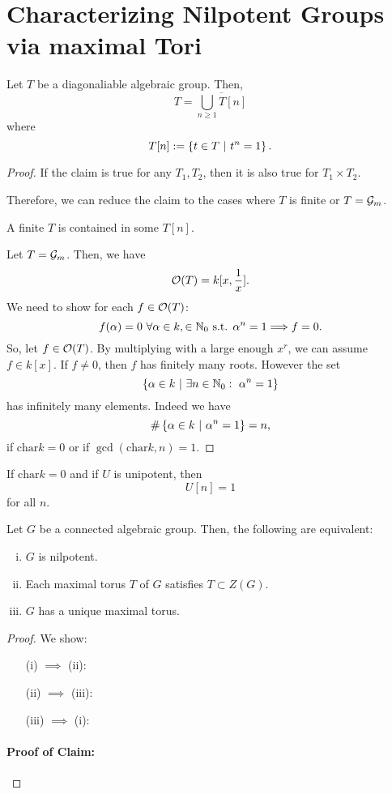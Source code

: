 \section{Characterizing Nilpotent Groups via maximal Tori}

\begin{lemma}
	Let $T$ be a diagonaliable algebraic group. Then,
	\[ T = \overline{\bigcup_{n \geq 1} T[n]} \]
	where
	\[ T[n] := \left\lbrace t \in T ~ | ~ t^n = 1\right\rbrace. \]
\end{lemma}
\begin{proof}
	If the claim is true for any $T_1, T_2$, then it is also true for $T_1\times T_2$.
	
	Therefore, we can reduce the claim to the cases where $T$ is finite or $T = \mathcal{G}_m$.
	
	A finite $T$ is contained in some $T[n]$.
	
	Let $T = \mathcal{G}_m$. Then, we have
	\[ \mathcal{O}(T) = k[x, \frac{1}{x}]. \]
	We need to show for each $f \in \mathcal{O}(T)$:
	\[ f(\alpha)  = 0 ~\forall \alpha \in k, \in \mathbb{N}_0 \text{ s.t. } \alpha^n = 1 \overset{}{\Longrightarrow} f = 0. \]
	So, let $f \in \mathcal{O}(T)$. By multiplying with a large enough $x^r$, we can assume $f \in k[x]$. If $f\neq 0$, then $f$ has finitely many roots. However the set
	\[ \left\lbrace\alpha \in k ~ | ~ \exists n \in \mathbb{N}_0:~ \alpha^n = 1\right\rbrace \]
	has infinitely many elements. Indeed we have
	\[\# \left\lbrace\alpha \in k ~ | ~  \alpha^n = 1\right\rbrace = n, \]
	if $\mathrm{char} k = 0$ or if $\gcd(\mathrm{char} k , n) = 1$.
\end{proof}
\begin{remark}
	If $\mathrm{char} k = 0$ and if $U$ is unipotent, then
	\[U[n] = 1  \]
	for all $n$.
\end{remark}

\begin{theorem}
	Let $G$ be a connected algebraic group. Then, the following are equivalent:
	\begin{enumerate}[(i)]
		\item $G$ is nilpotent.
		\item Each maximal torus $T$ of $G$ satisfies $ T \subset Z(G)$.
		\item $G$ has a unique maximal torus.
	\end{enumerate}
\end{theorem}
\begin{proof}
	We show:
	\begin{enumerate}
		\item[(i) $\implies$ (ii):]
		\item[(ii) $\implies$ (iii):]
		\item[(iii) $\implies$ (i):]
	\end{enumerate}

\paragraph{Proof of Claim:}
\end{proof}